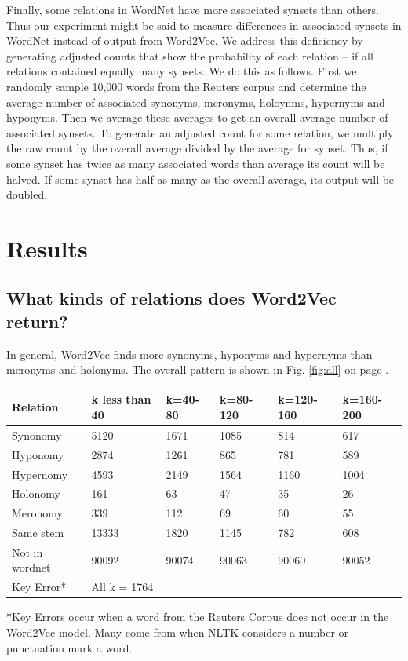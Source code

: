 \documentclass{article}
\begin{document}
Finally, some relations in WordNet have more associated synsets than others. Thus our experiment might be said to measure differences in associated synsets in WordNet instead of output from Word2Vec. We address this deficiency by generating adjusted counts that show the probability of each relation -- if all relations contained equally many synsets. We do this as follows. First we randomly sample 10,000 words from the Reuters corpus and determine the average number of associated synonyms, meronyms, holoynms, hypernyms and hyponyms. Then we average these averages to get an overall average number of associated synsets. To generate an adjusted count for some relation, we multiply the raw count by the overall average divided by the average for synset. Thus, if some synset has twice as many associated words than average its count will be halved. If some synset has half as many as the overall average, its output will be doubled.

\section{Results}

\subsection{What kinds of relations does Word2Vec return?} \label{binary}
In general, Word2Vec finds more synonyms, hyponyms and hypernyms than meronyms and holonyms. The overall pattern is shown in Fig. \ref{fig:all} on page \pageref{fig:all}.
\begin{center}
\centering
    \begin{tabular}{ | l | l | l | l | l | l |}
    \hline
Relation & k less than 40 & k=40-80 & k=80-120 & k=120-160 & k=160-200 \\  \hline
Synonomy &5120 & 1671 & 1085 & 814 & 617\\  \hline
Hyponomy &2874 & 1261 & 865 & 781 & 589\\  \hline
Hypernomy &4593 & 2149 & 1564 & 1160 & 1004\\  \hline
Holonomy &161 & 63 & 47 & 35 & 26\\  \hline
Meronomy &339 & 112 & 69 & 60 & 55\\  \hline
Same stem &13333 & 1820 & 1145 & 782 & 608\\  \hline
Not in wordnet &90092 & 90074 & 90063 & 90060 & 90052\\  \hline
Key Error* &  All k = 1764 \\  \hline
    \end{tabular}
\end{center}
*Key Errors occur when a word from the Reuters Corpus does not occur in the Word2Vec model. Many come from when NLTK considers a number or punctuation mark a word.
\end{document}
